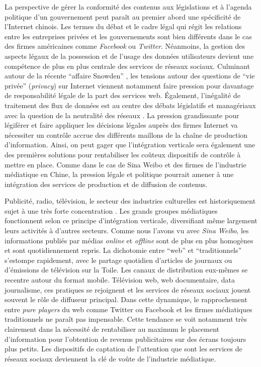 La perspective de gérer la conformité des contenus aux législations et à l'agenda politique d'un gouvernement peut paraît au premier abord une spécificité de l'Internet chinois. Les termes du débat et le cadre légal qui régit les relations entre les entreprises privées et les gouvernements sont bien différents dans le cas des firmes américaines comme \textit{Facebook} ou \textit{Twitter}. Néanmoins, la gestion des aspects légaux de la possession et de l'usage des données utilisateurs devient une compétence de plus en plus centrale des services de réseaux sociaux. Culminant autour de la récente ``affaire Snowden'' \citep{Greenwald2013}, les tensions autour des questions de ``vie privée'' (\textit{privacy}) sur Internet viennent notamment faire pression pour davantage de responsabilité légale de la part des services web. Également, l'inégalité de traitement des flux de données est au centre des débats législatifs et managériaux avec la question de la neutralité des réseaux \citep{Schafer2011}. La pression grandissante pour légiférer et faire appliquer les décisions légales auprès des firmes Internet va nécessiter un contrôle accrue des différents maillons de la chaîne de production d'information. Ainsi, on peut gager que l'intégration verticale sera également une des premières solutions pour rentabiliser les coûteux dispositifs de contrôle à mettre en place. Comme dans le cas de Sina Weibo et des firmes de l'industrie médiatique en Chine, la pression légale et politique pourrait amener à une intégration des services de production et de diffusion de contenus.

Publicité, radio, télévision, le secteur des industries culturelles est historiquement sujet à une très forte concentration \citep{Martel2010}. Les grands groupes médiatiques fonctionnent selon ce principe d'intégration verticale, diversifiant même largement leurs activités à d'autres secteurs. Comme nous l'avons vu avec \textit{Sina Weibo}, les informations publiés par médias \textit{online} et \textit{offline} sont de plus en plus homogènes et sont quotidiennement repris. La dichotomie entre ``web'' et ``traditionnels'' s'estompe rapidement, avec le partage quotidien d'articles de journaux ou d'émissions de télévision sur la Toile. Les canaux de distribution eux-mêmes se recentre autour du format mobile. Télévision web,  web documentaire, data journalisme, ces pratiques se rejoignent et les services de réseaux sociaux jouent souvent le rôle de diffuseur principal. Dans cette dynamique, le rapprochement entre \textit{pure players} du web comme Twitter ou Facebook et les firmes médiatiques traditionnels ne paraît pas impensable. Cette tendance se voit notamment très clairement dans la nécessité de rentabiliser au maximum le placement d'information pour l'obtention de revenus publicitaires sur des écrans toujours plus petits. Les dispositifs de captation de l'attention que sont les services de réseaux sociaux deviennent la clé de voûte de l'industrie médiatique. 

